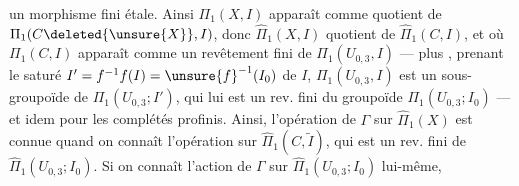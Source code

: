 un morphisme fini étale. Ainsi $\Pi_1(X,I)$ apparaît comme quotient de $\Pi_1(C\deleted{\unsure{X}},I)$, donc $\widehat\Pi_1(X,I)$ quotient de $\widehat\Pi_1(C,I)$, et où $\Pi_1(C,I)$ apparaît comme un revêtement fini de $\Pi_1(U_{0,3},I)$ --- plus  , prenant le saturé $I'=f^{-1}f(I)=\unsure{f}^{-1}(I_0)$ de $I$, $\Pi_1(U_{0,3},I)$ est un sous-groupoïde  de $\Pi_1(U_{0,3};I')$, qui lui est un rev. fini du groupoïde $\Pi_1(U_{0,3};I_0)$ --- et idem pour les complétés profinis. Ainsi, l'opération de $\Gamma$ sur $\widehat\Pi_1(X)$ est connue quand on connaît l'opération sur $\widehat\Pi_1(C,\widetilde I)$, qui est un rev. fini de $\widehat\Pi_1(U_{0,3};I_0)$. Si on connaît l'action de $\Gamma$ sur $\widehat\Pi_1(U_{0,3};I_0)$ lui-même, 
